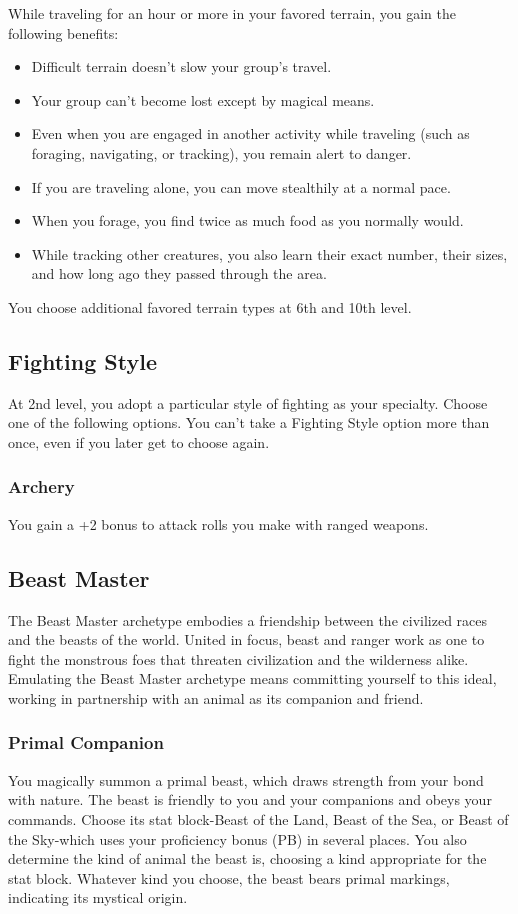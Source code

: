 {While traveling for an hour or more in your favored terrain, you gain the following benefits:
\begin{itemize}
	\item Difficult terrain doesn’t slow your group’s travel.
	\item Your group can’t become lost except by magical means.
	\item Even when you are engaged in another activity while traveling (such as foraging, navigating, or tracking), you remain alert to danger.
	\item If you are traveling alone, you can move stealthily at a normal pace.
	\item When you forage, you find twice as much food as you normally would.
	\item While tracking other creatures, you also learn their exact number, their sizes, and how long ago they passed through the area.
\end{itemize}
You choose additional favored terrain types at 6th and 10th level.
\subsection*{Fighting Style}
At 2nd level, you adopt a particular style of fighting as your specialty. Choose one of the following options. You can't take a Fighting Style option more than once, even if you later get to choose again.
\subsubsection*{Archery}
You gain a +2 bonus to attack rolls you make with ranged weapons.
\subsection*{Beast Master}
The Beast Master archetype embodies a friendship between the civilized races and the beasts of the world. United in focus, beast and ranger work as one to fight the monstrous foes that threaten civilization and the wilderness alike. Emulating the Beast Master archetype means committing yourself to this ideal, working in partnership with an animal as its companion and friend.
\subsubsection*{Primal Companion}
You magically summon a primal beast, which draws strength from your bond with nature. The beast is friendly to you and your companions and obeys your commands. Choose its stat block-Beast of the Land, Beast of the Sea, or Beast of the Sky-which uses your proficiency bonus (PB) in several places. You also determine the kind of animal the beast is, choosing a kind appropriate for the stat block. Whatever kind you choose, the beast bears primal markings, indicating its mystical origin.

}
